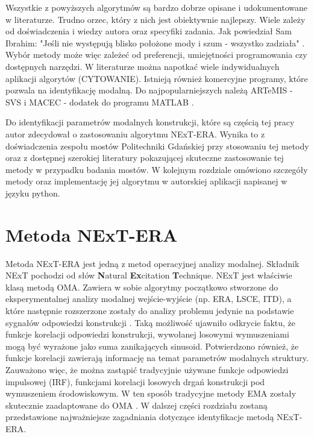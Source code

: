 Wszystkie z powyższych algorytmów są bardzo dobrze opisane i udokumentowane w literaturze. Trudno orzec, który z nich jest obiektywnie najlepszy. Wiele zależy od doświadczenia i wiedzy autora oraz specyfiki zadania. Jak powiedział Sam Ibrahim: "Jeśli nie występują blisko położone mody i szum - wszystko zadziała" . Wybór metody może więc zależeć od preferencji, umiejętności programowania czy dostępnych narzędzi. W literaturze można napotkać wiele indywidualnych aplikacji algorytów (CYTOWANIE). Istnieją również komercyjne programy, które pozwala na identyfikację modalną. Do najpopularniejszych należą ARTeMIS - SVS \parencite{Extractor1999} i MACEC - dodatek do programu MATLAB \parencite{Reynders2014}.

Do identyfikacji parametrów modalnych konstrukcji, które są częścią tej pracy autor zdecydował o zastosowaniu algorytmu NExT-ERA. Wynika to z doświadczenia zespołu mostów Politechniki Gdańskiej przy stosowaniu tej metody oraz z dostępnej szerokiej literatury pokazującej skuteczne zastosowanie tej metody w przypadku badania mostów. W kolejnym rozdziale omówiono szczegóły metody oraz implementację jej algorytmu w autorskiej aplikacji napisanej w języku python.

\section{Metoda NExT-ERA}
Metoda NExT-ERA jest jedną z metod operacyjnej analizy modalnej. Składnik NExT pochodzi od słów \textbf{N}atural \textbf{Ex}citation \textbf{T}echnique. NExT jest właściwie klasą metodą OMA. Zawiera w sobie algorytmy początkowo stworzone do eksperymentalnej analizy modalnej wejście-wyjście  (np. ERA, LSCE, ITD), a które następnie rozszerzone zostały do analizy problemu jedynie na podstawie sygnałów odpowiedzi konstrukcji . Taką możliwość ujawniło odkrycie faktu, że funkcje korelacji odpowiedzi konstrukcji, wywołanej losowymi wymuszeniami mogą być wyrażone jako suma zanikających sinusoid. Potwierdzono również, że funkcje korelacji zawierają informację na temat parametrów modalnych struktury. Zauważono więc, że można zastąpić tradycyjnie używane funkcje odpowiedzi impulsowej (IRF), funkcjami korelacji losowych drgań konstrukcji pod wymuszeniem środowiskowym. W ten sposób tradycyjne metody EMA zostały skutecznie zaadaptowane do OMA \parencite{Rainieri2014}. W dalszej części rozdziału zostaną przedstawione najważniejsze zagadniania dotyczące identyfikacje metodą NExT-ERA. 

